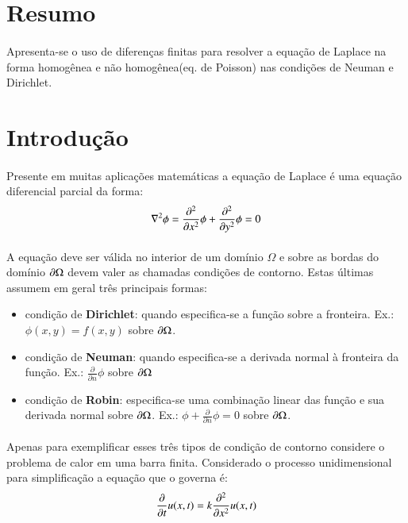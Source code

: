 \documentclass[a4paper,11pt]{article}
\begin{document}

\EmptyPage

\section{Resumo}
\paragraph{} Apresenta-se o uso de diferenças finitas para resolver a equação de Laplace na forma homogênea e não homogênea(eq. de Poisson) nas condições de Neuman e Dirichlet.

\section{Introdução}
\paragraph{}Presente em muitas aplicações matemáticas a equação de Laplace é uma equação diferencial parcial da forma:
\begin{equation}
	\nabla ^2 \phi = \del{x}{2} \phi + \del{y}{2} \phi = 0
\end{equation}
\paragraph{}A equação deve ser válida no interior de um domínio $\Omega$ e sobre as bordas do domínio $\partial \Omega$ devem valer as chamadas condições de contorno. Estas últimas assumem em geral três principais formas:
\begin{itemize}
	\item condição de \textbf{Dirichlet}: quando especifica-se a função sobre a fronteira. Ex.: $\phi (x,y) = f(x,y)$ sobre $\partial \Omega$.
	\item condição de \textbf{Neuman}: quando especifica-se a derivada normal à fronteira da função. Ex.: $\frac{\partial}{\partial n} \phi$ sobre $\partial \Omega$  
	\item condição de \textbf{Robin}: especifica-se uma combinação linear das função e sua derivada normal sobre $\partial \Omega$. Ex.: $\phi + \frac{\partial}{\partial n} \phi =  0$ sobre $\partial \Omega$. 
\end{itemize}

\paragraph{} Apenas para exemplificar esses três tipos de condição de contorno considere o problema de calor em uma barra finita. Considerado o processo unidimensional para simplificação a equação que o governa é: 
\begin{equation}
	\del{t}{1} u(x,t) = k \del{x}{2} u(x,t)
\end{equation}
\end{document}
